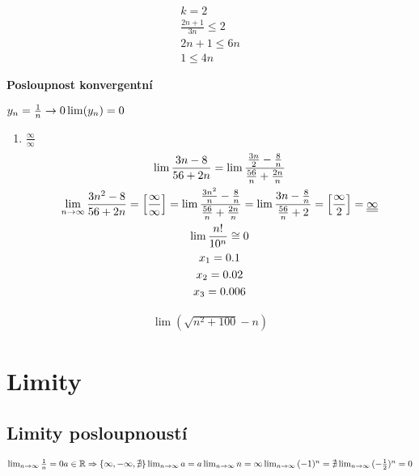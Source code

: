 \begin{gather*}
    k = 2
    \\ \frac{2n+1}{3n} \leq  2
    \\ 2n+1 \leq 6n
    \\ 1 \leq 4n
\end{gather*}

\textbf{Posloupnost konvergentní}
\begin{description}
    $ y_n = \frac{1}{n} \rightarrow 0 \\ \lim(y_n) = 0$
\end{description}

\begin{enumerate}
    \item $\frac{\infty}{\infty}$
    \begin{gather}
        \lim{\frac{3n-8}{56+2n}} = 
         \lim{\frac{\frac{3n}{2} - \frac{8}{n}}{\frac{56}{n}+\frac{2n}{n}}}
         \\
         \lim_{n\rightarrow\infty}{\frac{3n^2-8}{56+2n}} = \left[\frac{\infty}{\infty}\right] =
          \lim{\frac{\frac{3n^2}{n}-\frac{8}{n}}{\frac{56}{n}+\frac{2n}{n}}} =
          \lim{\frac{3n- \frac{8}{n}}{\frac{56}{n} + 2}} = \left[ \frac{\infty}{2}\right] = \underline{\underline{\infty}}
        \\
        \lim{\frac{n!}{10^n}} \cong 0
        \\x_1 = 0.1
        \\x_2 = 0.02
        \\x_3 = 0.006
    \end{gather}
\end{enumerate}
\begin{align}
    \lim{(\sqrt{n^2+100}-n)}
\end{align}
\section*{Limity}
\subsection*{Limity posloupnoustí}
\begin{math}
    \lim_{n\rightarrow \infty}{\frac{1}{n}} = 0 \\
    a \in \mathbb{R} \Rightarrow \{\infty, -\infty, \nexists\} \\
    \lim_{n\rightarrow \infty}{a} = a \\
    \lim_{n\rightarrow \infty}{n} = \infty \\
    \lim_{n\rightarrow \infty}{(-1)^n} = \nexists\\
    \lim_{n\rightarrow \infty}{(-\frac{1}{2})^n} = 0
\end{math}
